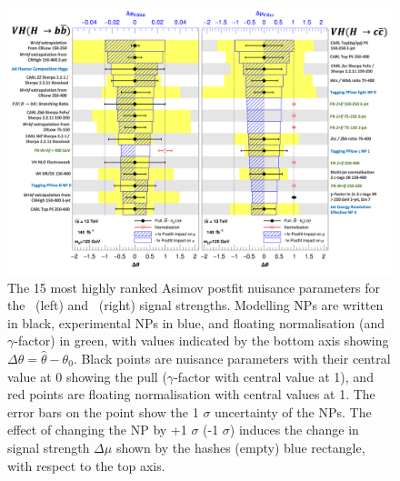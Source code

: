 \begin{figure}[h!]
    \centering
    \includegraphics[width=\textwidth]{Images/VH/Fit/fromSlides/ranking.png}
    \caption{The 15 most highly ranked Asimov postfit nuisance parameters for the \vhb\ (left) and \vhc\ (right) signal strengths. Modelling NPs are written in black, experimental NPs in blue, and floating normalisation (and $\gamma$-factor) in green, with values indicated by the bottom axis showing $\Delta \theta = \hat{\theta} - \theta_0$. Black points are nuisance parameters with their central value at 0 showing the pull ($\gamma$-factor with central value at 1), and red points are floating normalisation with central values at 1. The error bars on the point show the 1 $\sigma$ uncertainty of the NPs. The effect of changing the NP by +1 $\sigma$ (-1 $\sigma$) induces the change in signal strength $\Delta\mu$ shown by the hashes (empty) blue rectangle, with respect to the top axis.}
    \label{fig:rankingPostfit}
\end{figure} 

